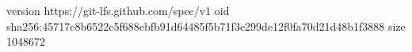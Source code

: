 version https://git-lfs.github.com/spec/v1
oid sha256:45717c8b6522c5f688ebfb91d64485f5b71f3c299de12f0fa70d21d48b1f3888
size 1048672
